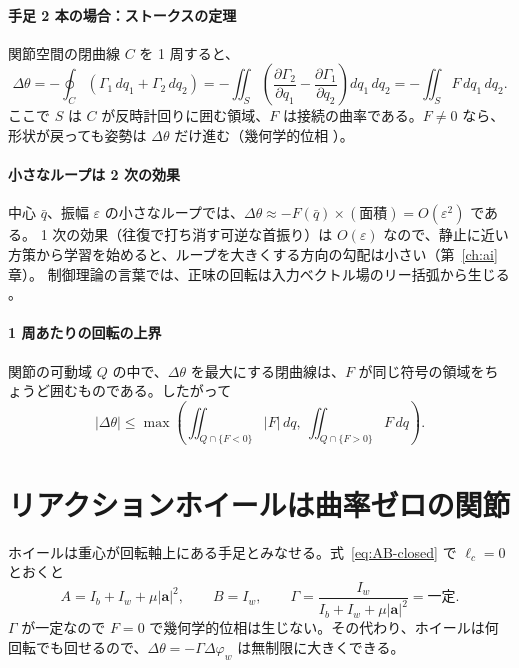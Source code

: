 \paragraph{手足 2 本の場合：ストークスの定理}
関節空間の閉曲線 $C$ を 1 周すると、
\begin{equation}
\Delta\theta = -\oint_C \left(\Gamma_1\,dq_1+\Gamma_2\,dq_2\right)
 = -\iint_S\left(\frac{\partial\Gamma_2}{\partial q_1}-\frac{\partial\Gamma_1}{\partial q_2}\right)dq_1\,dq_2
 = -\iint_S F\,dq_1\,dq_2. \label{eq:stokes}
\end{equation}
ここで $S$ は $C$ が反時計回りに囲む領域、$F$ は接続の曲率である。$F\neq 0$ なら、形状が戻っても姿勢は $\Delta\theta$ だけ進む（幾何学的位相 \cite{R6}）。

\paragraph{小さなループは 2 次の効果}
中心 $\bar q$、振幅 $\varepsilon$ の小さなループでは、$\Delta\theta \approx -F(\bar q)\times(\text{面積}) = O(\varepsilon^2)$ である。
1 次の効果（往復で打ち消す可逆な首振り）は $O(\varepsilon)$ なので、静止に近い方策から学習を始めると、ループを大きくする方向の勾配は小さい（第~\ref{ch:ai}章）。
制御理論の言葉では、正味の回転は入力ベクトル場のリー括弧から生じる \cite{R10}。

\paragraph{1 周あたりの回転の上界}
関節の可動域 $Q$ の中で、$\Delta\theta$ を最大にする閉曲線は、$F$ が同じ符号の領域をちょうど囲むものである。したがって
\begin{equation}
|\Delta\theta| \le \max\left(\iint_{Q\cap\{F<0\}}|F|\,dq,\ \iint_{Q\cap\{F>0\}}F\,dq\right).
\end{equation}

\section{リアクションホイールは曲率ゼロの関節}\label{app:rw}

ホイールは重心が回転軸上にある手足とみなせる。式~\eqref{eq:AB-closed} で $\ell_c=0$ とおくと
\begin{equation}
A = I_b + I_w + \mu|\bm a|^2,\qquad B = I_w,\qquad \Gamma = \frac{I_w}{I_b+I_w+\mu|\bm a|^2} = \text{一定}.
\end{equation}
$\Gamma$ が一定なので $F=0$ で幾何学的位相は生じない。その代わり、ホイールは何回転でも回せるので、$\Delta\theta=-\Gamma\Delta\varphi_w$ は無制限に大きくできる。

